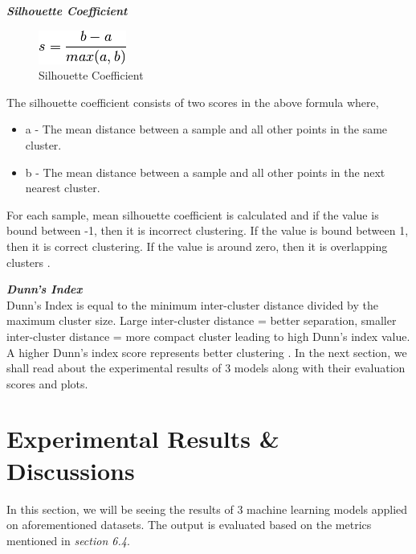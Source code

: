 \documentclass[format=sigconf]{acmart}
\begin{document}
\textit{\textbf{Silhouette Coefficient}}\\
\begin{figure}[H]
    \centering
    \includegraphics[scale=0.60]{silhouette_coefficient.png}
    \caption{Silhouette Coefficient}
    \label{fig:silc}
\end{figure}

The silhouette coefficient consists of two scores in the above formula where, 
\begin{itemize}
    \item a - The mean distance between a sample and all other points in the same cluster.
    \item b - The mean distance between a sample and all other points in the next nearest cluster.
\end{itemize}
For each sample, mean silhouette coefficient is calculated and if the value is bound between -1, then it is incorrect clustering. If
the value is bound between 1, then it is correct clustering. If the value is around zero, then it is overlapping clusters \cite{evaluationmetric}.

\textit{\textbf{Dunn's Index}} \\
Dunn’s Index is equal to the minimum inter-cluster distance divided by the maximum cluster size. 
Large inter-cluster distance = better separation, smaller inter-cluster distance = more compact cluster leading to high Dunn's index
value. A higher Dunn’s index score represents better clustering \cite{evaluationmetric}. In the next section, we shall read about the experimental
results of 3 models along with their evaluation scores and plots.

\section{Experimental Results \& Discussions}
In this section, we will be seeing the results of 3 machine learning models applied on aforementioned datasets. The output is 
evaluated based on the metrics mentioned in \textit{section 6.4}.
\end{document}
